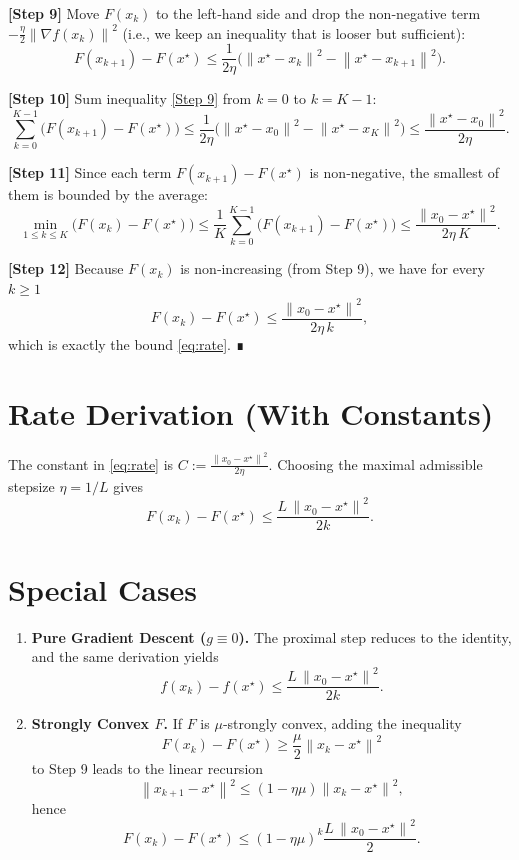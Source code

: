 \documentclass{article}
\newcommand{\grad}{\nabla}
\newcommand{\norm}[1]{\left\lVert #1 \right\rVert}
\begin{document}
\noindent\textbf{[Step 9]} Move $F(x_{k})$ to the left‑hand side and drop the non‑negative term $-\frac{\eta}{2}\norm{\grad f(x_{k})}^{2}$ (i.e., we keep an inequality that is looser but sufficient):
\[
F(x_{k+1})-F(x^{\star})
   \le \frac{1}{2\eta}\big(\norm{x^{\star}-x_{k}}^{2}-\norm{x^{\star}-x_{k+1}}^{2}\big). \tag{Step 9}
\]

\noindent\textbf{[Step 10]} Sum inequality \eqref{Step 9} from $k=0$ to $k=K-1$:
\[
\sum_{k=0}^{K-1}\!\big(F(x_{k+1})-F(x^{\star})\big)
   \le \frac{1}{2\eta}\big(\norm{x^{\star}-x_{0}}^{2}-\norm{x^{\star}-x_{K}}^{2}\big)
   \le\frac{\norm{x^{\star}-x_{0}}^{2}}{2\eta}. \tag{Step 10}
\]

\noindent\textbf{[Step 11]} Since each term $F(x_{k+1})-F(x^{\star})$ is non‑negative, the smallest of them is bounded by the average:
\[
\min_{1\le k\le K}\big(F(x_{k})-F(x^{\star})\big)
   \le \frac{1}{K}\sum_{k=0}^{K-1}\!\big(F(x_{k+1})-F(x^{\star})\big)
   \le \frac{\norm{x_{0}-x^{\star}}^{2}}{2\eta\,K}. \tag{Step 11}
\]

\noindent\textbf{[Step 12]} Because $F(x_{k})$ is non‑increasing (from Step 9), we have for every $k\ge1$
\[
F(x_{k})-F(x^{\star})\le\frac{\norm{x_{0}-x^{\star}}^{2}}{2\eta\,k},
\]
which is exactly the bound \eqref{eq:rate}. ∎

\section*{Rate Derivation (With Constants)}
The constant in \eqref{eq:rate} is $\displaystyle C:=\frac{\norm{x_{0}-x^{\star}}^{2}}{2\eta}$.  
Choosing the maximal admissible stepsize $\eta=1/L$ gives
\[
F(x_{k})-F(x^{\star})\le\frac{L\,\norm{x_{0}-x^{\star}}^{2}}{2k}.
\]

\section*{Special Cases}
\begin{enumerate}[noitemsep]
\item \textbf{Pure Gradient Descent ($g\equiv0$).} The proximal step reduces to the identity, and the same derivation yields
\[
f(x_{k})-f(x^{\star})\le\frac{L\,\norm{x_{0}-x^{\star}}^{2}}{2k}.
\]
\item \textbf{Strongly Convex $F$.} If $F$ is $\mu$‑strongly convex, adding the inequality
\[
F(x_{k})-F(x^{\star})\ge\frac{\mu}{2}\norm{x_{k}-x^{\star}}^{2}
\]
to Step 9 leads to the linear recursion
\[
\norm{x_{k+1}-x^{\star}}^{2}\le(1-\eta\mu)\norm{x_{k}-x^{\star}}^{2},
\]
hence
\[
F(x_{k})-F(x^{\star})\le(1-\eta\mu)^{k}\frac{L\,\norm{x_{0}-x^{\star}}^{2}}{2}.
\]
\end{enumerate}
\end{document}

